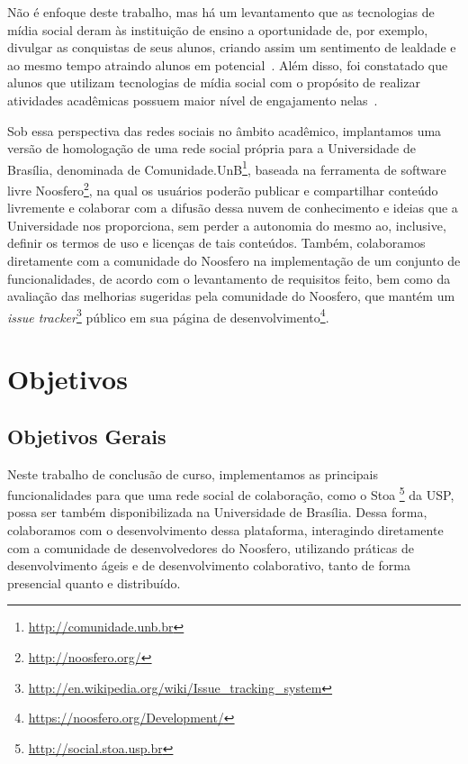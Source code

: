  
 
Não é enfoque deste trabalho, mas há um levantamento que as tecnologias de mídia social deram às
instituição de ensino a oportunidade de, por exemplo, divulgar as conquistas de seus alunos,
criando assim um sentimento de lealdade e ao mesmo tempo atraindo alunos em
potencial~\cite{solis2008}. 
%
Além disso, foi constatado que alunos que utilizam tecnologias de mídia social
com o propósito de realizar atividades acadêmicas possuem maior nível de
engajamento nelas~. 
 
 
Sob essa perspectiva das redes sociais no âmbito acadêmico, implantamos uma versão de homologação
de uma rede social própria para a Universidade de
Brasília, denominada de Comunidade.UnB\footnote{\url{http://comunidade.unb.br}}, baseada na ferramenta de software livre 
Noosfero\footnote{\url{http://noosfero.org/}},
na qual os usuários poderão publicar e compartilhar conteúdo livremente e
colaborar com a difusão dessa nuvem de conhecimento e ideias que a Universidade
nos proporciona, sem perder a autonomia do mesmo ao, inclusive, definir os termos
de uso e licenças de tais conteúdos.
%
Também, colaboramos diretamente com a comunidade do Noosfero na implementação
de um conjunto de funcionalidades, de acordo com o levantamento de requisitos feito,
bem como da avaliação das melhorias sugeridas pela comunidade do Noosfero, que mantém
um \textit{issue tracker}\footnote{\url{http://en.wikipedia.org/wiki/Issue_tracking_system}}
público em sua página de desenvolvimento\footnote{\url{https://noosfero.org/Development/}}.
 
 
\section{Objetivos}
 
\subsection{Objetivos Gerais}
 
Neste trabalho de conclusão de curso, implementamos as
principais funcionalidades para que uma rede social de colaboração, como o Stoa%
\footnote{\url{http://social.stoa.usp.br}} da USP, 
possa ser também disponibilizada na Universidade de Brasília. 
%
Dessa forma, colaboramos com o desenvolvimento dessa plataforma, interagindo diretamente com
a comunidade de desenvolvedores do Noosfero, utilizando práticas de desenvolvimento ágeis e
de desenvolvimento colaborativo, tanto de forma presencial quanto e distribuído.
 
